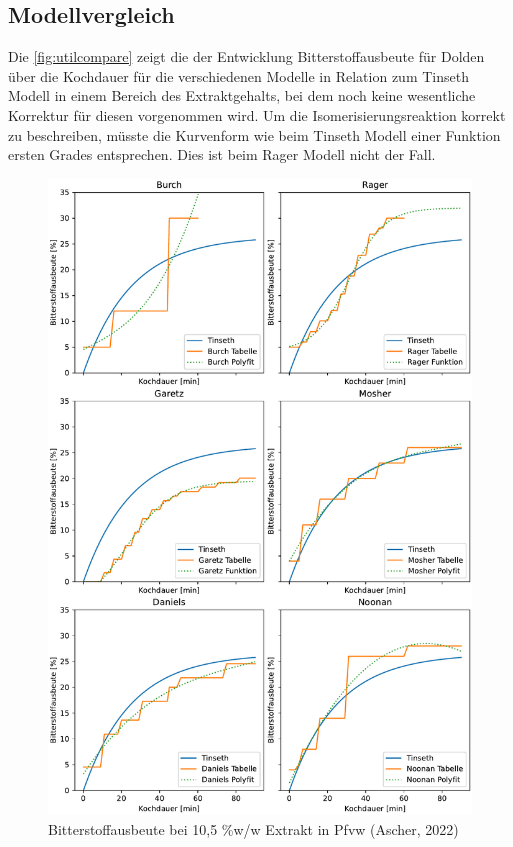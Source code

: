 \documentclass[a4paper,parskip=half]{scrartcl}
\begin{document}
\subsection*{Modellvergleich}

Die \autoref{fig:utilcompare} zeigt die der Entwicklung Bitterstoffausbeute für Dolden über die Kochdauer für die verschiedenen Modelle in Relation zum Tinseth Modell in einem Bereich des Extraktgehalts, bei dem noch keine wesentliche Korrektur für diesen vorgenommen wird. Um die Isomerisierungsreaktion korrekt zu beschreiben, müsste die Kurvenform wie beim Tinseth Modell einer Funktion ersten Grades entsprechen. Dies ist beim Rager Modell nicht der Fall.

\begin{figure}[h]
\centering
\includegraphics[width=14cm]{graph_utilization.pdf}
\caption{Bitterstoffausbeute bei 10,5 \%w/w Extrakt in Pfvw (Ascher, 2022)}
\label{fig:utilcompare}
\end{figure}
\end{document}
